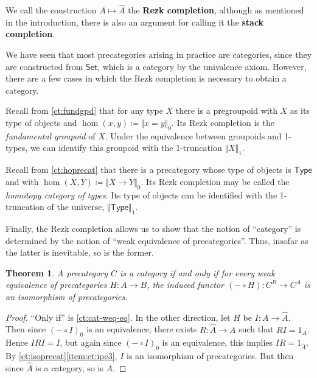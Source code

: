 \documentclass{amsart}
\newcommand{\defeq}{\coloneqq}  %
\newcommand{\type}{\ensuremath{\mathsf{Type}}\xspace}
\renewcommand{\set}{\ensuremath{\mathsf{Set}}\xspace}
\newcommand{\trunc}[2]{\Vert #2\Vert_{#1}}
\def\pizero{\trunc0}
\newcommand{\uset}{\ensuremath{\underline{\set}}\xspace}
\newtheorem{thm}{Theorem}[section]
\theoremstyle{definition}
\theoremstyle{remark}
\numberwithin{equation}{section}
\begin{document}
We call the construction $A\mapsto \widehat A$ the \textbf{Rezk completion}, although as mentioned in the introduction, there is also an argument for calling it the \textbf{stack completion}.

We have seen that most precategories arising in practice are categories, since they are constructed from \uset, which is a category by the univalence axiom.
However, there are a few cases in which the Rezk completion is necessary to obtain a category.

\begin{eg}
  Recall from \autoref{ct:fundgpd} that for any type $X$ there is a pregroupoid with $X$ as its type of objects and $\hom(x,y) \defeq \pizero{x=y}$.
  Its Rezk completion is the \emph{fundamental groupoid} of $X$.
  Under the equivalence between groupoids and 1-types, we can identify this groupoid with the 1-truncation $\trunc1X$.
\end{eg}

\begin{eg}\label{ct:hocat}
  Recall from \autoref{ct:hoprecat} that there is a precategory whose type of objects is \type and with $\hom(X,Y) \defeq \pizero{X\to Y}$.
  Its Rezk completion may be called the \emph{homotopy category of types}.
  Its type of objects can be identified with the 1-truncation of the universe, $\trunc1\type$.
\end{eg}

Finally, the Rezk completion allows us to show that the notion of ``category'' is determined by the notion of ``weak equivalence of precategories''.
Thus, insofar as the latter is inevitable, so is the former.

\begin{thm}
  A precategory $C$ is a category if and only if for every weak equivalence of precategories $H:A\to B$, the induced functor $(-\circ H):C^B \to C^A$ is an isomorphism of precategories.
\end{thm}
\begin{proof}
  ``Only if'' is \autoref{ct:cat-weq-eq}.
  In the other direction, let $H$ be $I:A\to\widehat A$.
  Then since $(-\circ I)_0$ is an equivalence, there exists $R:\widehat A\to A$ such that $RI=1_A$.
  Hence $IRI=I$, but again since $(-\circ I)_0$ is an equivalence, this implies $IR =1_{\widehat A}$.
  By \autoref{ct:isoprecat}\ref{item:ct:ipc3}, $I$ is an isomorphism of precategories.
  But then since $\widehat A$ is a category, so is $A$.
\end{proof}



\end{document}
